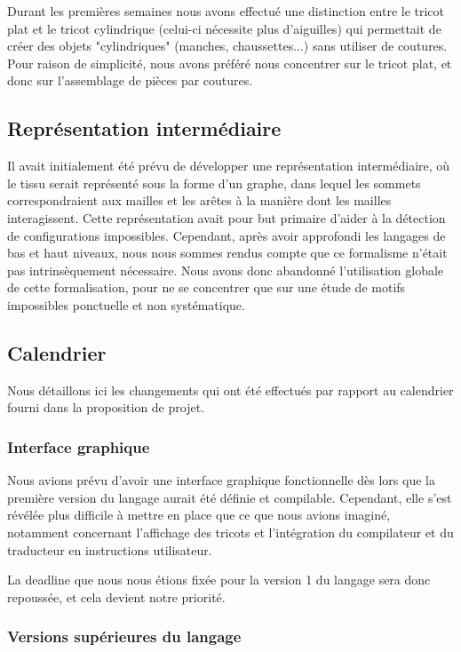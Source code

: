 \documentclass{article}
\begin{document}
Durant les premières semaines nous avons effectué une distinction entre le tricot plat et le tricot cylindrique (celui-ci nécessite plus d'aiguilles) qui permettait de créer des objets "cylindriques" (manches, chaussettes...) sans utiliser de coutures. Pour raison de simplicité, nous avons préféré nous concentrer sur le tricot plat, et donc sur l'assemblage de pièces par coutures.

\subsection{Représentation intermédiaire} 

Il avait initialement été prévu de développer une représentation intermédiaire, où le tissu serait représenté sous la forme d'un graphe,
dans lequel les sommets correspondraient aux mailles et les arêtes à la manière dont les mailles interagissent. Cette représentation avait
pour but primaire d'aider à la détection de configurations impossibles. Cependant, après avoir approfondi les langages de bas et haut
niveaux, nous nous sommes rendus compte que ce formalisme n'était pas intrinsèquement nécessaire. %
Nous avons donc abandonné l'utilisation globale de cette formalisation, pour ne se concentrer que sur une étude de motifs impossibles
ponctuelle et non systématique.

\subsection{Calendrier}

Nous détaillons ici les changements qui ont été effectués par rapport au calendrier fourni dans la proposition de projet.

\subsubsection{Interface graphique}

Nous avions prévu d'avoir une interface graphique fonctionnelle dès lors que la première version du langage aurait été définie et compilable.  
Cependant, elle s'est révélée plus difficile à mettre en place que ce que nous avions imaginé, notamment concernant l'affichage des tricots et l'intégration du compilateur et du traducteur en instructions utilisateur.

La deadline que nous nous étions fixée pour la version 1 du langage sera donc repoussée, et cela devient notre priorité.

\subsubsection{Versions supérieures du langage}
\end{document}
